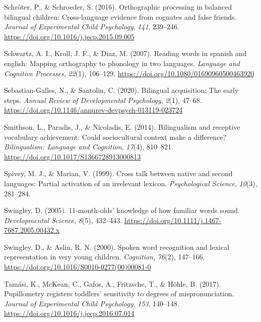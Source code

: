 \documentclass[
]{article}
\newlength{\cslhangindent}
\newlength{\cslentryspacingunit} %
\newenvironment{CSLReferences}[2] %
 {%
  \setlength{\parindent}{0pt}
  \ifodd #1
  \let\oldpar\par
  \def\par{\hangindent=\cslhangindent\oldpar}
  \fi
  \setlength{\parskip}{#2\cslentryspacingunit}
 }%
 {}
\begin{document}
\begin{CSLReferences}{1}{0}
\leavevmode{}%
Schröter, P., \& Schroeder, S. (2016). Orthographic processing in
balanced bilingual children: Cross-language evidence from cognates and
false friends. \emph{Journal of Experimental Child Psychology},
\emph{141}, 239--246. \url{https://doi.org/10.1016/j.jecp.2015.09.005}

\leavevmode{}%
Schwartz, A. I., Kroll, J. F., \& Diaz, M. (2007). Reading words in
spanish and english: Mapping orthography to phonology in two languages.
\emph{Language and Cognitive Processes}, \emph{22}(1), 106--129.
\url{https://doi.org/10.1080/01690960500463920}

\leavevmode{}%
Sebastian-Galles, N., \& Santolin, C. (2020). Bilingual acquisition: The
early steps. \emph{Annual Review of Developmental Psychology},
\emph{2}(1), 47--68.
\url{https://doi.org/10.1146/annurev-devpsych-013119-023724}

\leavevmode{}%
Smithson, L., Paradis, J., \& Nicoladis, E. (2014). Bilingualism and
receptive vocabulary achievement: Could sociocultural context make a
difference? \emph{Bilingualism: Language and Cognition}, \emph{17}(4),
810--821. \url{https://doi.org/10.1017/S1366728913000813}

\leavevmode{}%
Spivey, M. J., \& Marian, V. (1999). Cross talk between native and
second languages: Partial activation of an irrelevant lexicon.
\emph{Psychological Science}, \emph{10}(3), 281--284.

\leavevmode{}%
Swingley, D. (2005). 11-month-olds' knowledge of how familiar words
sound. \emph{Developmental Science}, \emph{8}(5), 432--443.
\url{https://doi.org/10.1111/j.1467-7687.2005.00432.x}

\leavevmode{}%
Swingley, D., \& Aslin, R. N. (2000). Spoken word recognition and
lexical representation in very young children. \emph{Cognition},
\emph{76}(2), 147--166.
\url{https://doi.org/10.1016/S0010-0277(00)00081-0}

\leavevmode{}%
Tamási, K., McKean, C., Gafos, A., Fritzsche, T., \& Höhle, B. (2017).
Pupillometry registers toddlers' sensitivity to degrees of
mispronunciation. \emph{Journal of Experimental Child Psychology},
\emph{153}, 140--148. \url{https://doi.org/10.1016/j.jecp.2016.07.014}


\end{CSLReferences}
\end{document}
